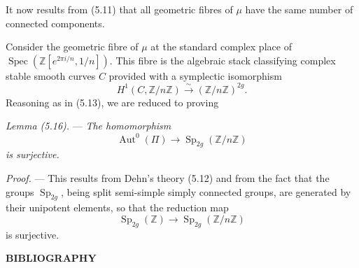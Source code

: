 \documentclass[10pt]{article}
\newcommand{\Spec}{\operatorname{Spec}}
\newcommand{\Aut}{\operatorname{Aut}}
\begin{document}
It now results from (5.11) that all geometric fibres of $\mu$ have the same number of connected components.

Consider the geometric fibre of $\mu$ at the standard complex place of $\Spec(\mathbb Z[e^{2\pi i/n},1/n])$. This fibre is the algebraic stack classifying complex stable smooth curves $C$ provided with a symplectic isomorphism
\[
H^1(C,\mathbb Z/n\mathbb Z)\xrightarrow{\sim}(\mathbb Z/n\mathbb Z)^{2g}.
\]
Reasoning as in (5.13), we are reduced to proving

\medskip
\noindent\emph{Lemma (5.16).} --- \emph{The homomorphism}
\[
\Aut^0(\Pi)\longrightarrow \operatorname{Sp}_{2g}(\mathbb Z/n\mathbb Z)
\]
\emph{is surjective.}

\noindent\emph{Proof.} --- This results from Dehn's theory (5.12) and from the fact that the groups $\operatorname{Sp}_{2g}$, being split semi-simple simply connected groups, are generated by their unipotent elements, so that the reduction map
\[
\operatorname{Sp}_{2g}(\mathbb Z)\longrightarrow \operatorname{Sp}_{2g}(\mathbb Z/n\mathbb Z)
\]
is surjective.

\begin{center}
{\bfseries BIBLIOGRAPHY}
\end{center}
\end{document}
